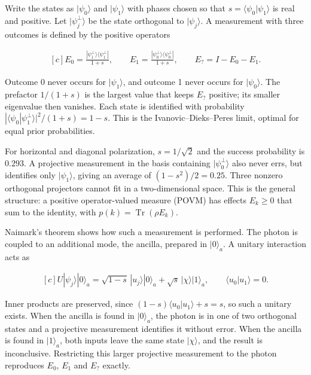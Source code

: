 \documentclass[11pt,oneside]{book}
\newenvironment{centeredalign}{\[\begin{gathered}[c]}{\end{gathered}\]}
\begin{document}
Write the states as \(|\psi_0\rangle\) and \(|\psi_1\rangle\) with phases chosen so that \(s=\langle\psi_0|\psi_1\rangle\) is real and positive. Let \(|\psi_j^\perp\rangle\) be the state orthogonal to \(|\psi_j\rangle\). A measurement with three outcomes is defined by the positive operators

\begin{centeredalign}
E_0=\frac{|\psi_1^\perp\rangle\langle\psi_1^\perp|}{1+s},\qquad
E_1=\frac{|\psi_0^\perp\rangle\langle\psi_0^\perp|}{1+s},\qquad
E_?=I-E_0-E_1.
\end{centeredalign}

Outcome 0 never occurs for \(|\psi_1\rangle\), and outcome 1 never occurs for \(|\psi_0\rangle\). The prefactor \(1/(1+s)\) is the largest value that keeps \(E_?\) positive; its smaller eigenvalue then vanishes. Each state is identified with probability \(|\langle\psi_0|\psi_1^\perp\rangle|^2/(1+s)=1-s\). This is the Ivanovic--Dieks--Peres limit, optimal for equal prior probabilities.

For horizontal and diagonal polarization, \(s=1/\sqrt2\) and the success probability is \(0.293\). A projective measurement in the basis containing \(|\psi_0^\perp\rangle\) also never errs, but identifies only \(|\psi_1\rangle\), giving an average of \((1-s^2)/2=0.25\). Three nonzero orthogonal projectors cannot fit in a two-dimensional space. This is the general structure: a positive operator-valued measure (POVM) has effects \(E_k\geq0\) that sum to the identity, with \(p(k)=\operatorname{Tr}(\rho E_k)\).

Naimark's theorem shows how such a measurement is performed. The photon is coupled to an additional mode, the ancilla, prepared in \(|0\rangle_a\). A unitary interaction acts as

\begin{centeredalign}
U|\psi_j\rangle|0\rangle_a=\sqrt{1-s}\,|u_j\rangle|0\rangle_a+\sqrt{s}\,|\chi\rangle|1\rangle_a,
\qquad\langle u_0|u_1\rangle=0.
\end{centeredalign}

Inner products are preserved, since \((1-s)\langle u_0|u_1\rangle+s=s\), so such a unitary exists. When the ancilla is found in \(|0\rangle_a\), the photon is in one of two orthogonal states and a projective measurement identifies it without error. When the ancilla is found in \(|1\rangle_a\), both inputs leave the same state \(|\chi\rangle\), and the result is inconclusive. Restricting this larger projective measurement to the photon reproduces \(E_0\), \(E_1\) and \(E_?\) exactly.
\end{document}
